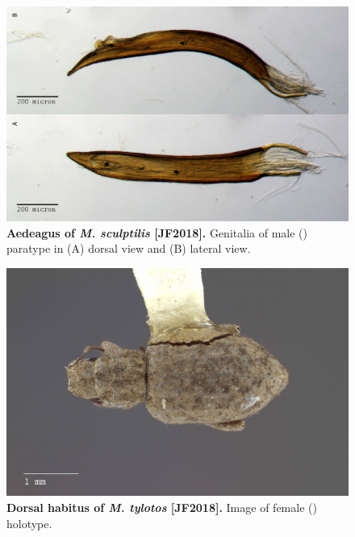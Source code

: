 \documentclass[fleqn,10pt,lineno]{wlpeerj} %
\begin{document}
\begin{figure}[h]
	\centering
	\begin{sideways}
		\includegraphics[width=0.95\textheight]{figure22.jpg}
	\end{sideways}
	\caption{\textbf{Aedeagus of \textit{M. sculptilis} [JF2018].} Genitalia of male (\male) paratype in (A) dorsal view and (B) lateral view.}
	\label{fig:sculptilis_aedeagus}
\end{figure}

\begin{figure}[h]
	\begin{sideways}
		\centering
		\includegraphics[height=\textwidth]{figure23.jpg}
	\end{sideways}
	\caption{\textbf{Dorsal habitus of \textit{M. tylotos} [JF2018].} Image of female (\female) holotype.}
	\label{fig:tylotos_F_dorsal}
\end{figure}
\end{document}
